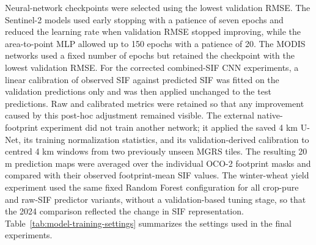 Neural-network checkpoints were selected using the lowest validation RMSE. The Sentinel-2 models used early stopping with a patience of seven epochs and reduced the learning rate when validation RMSE stopped improving, while the area-to-point MLP allowed up to 150 epochs with a patience of 20. The MODIS networks used a fixed number of epochs but retained the checkpoint with the lowest validation RMSE. For the corrected combined-SIF CNN experiments, a linear calibration of observed SIF against predicted SIF was fitted on the validation predictions only and was then applied unchanged to the test predictions. Raw and calibrated metrics were retained so that any improvement caused by this post-hoc adjustment remained visible. The external native-footprint experiment did not train another network; it applied the saved 4 km U-Net, its training normalization statistics, and its validation-derived calibration to centred 4 km windows from two previously unseen MGRS tiles. The resulting 20 m prediction maps were averaged over the individual OCO-2 footprint masks and compared with their observed footprint-mean SIF values. The winter-wheat yield experiment used the same fixed Random Forest configuration for all crop-pure and raw-SIF predictor variants, without a validation-based tuning stage, so that the 2024 comparison reflected the change in SIF representation. Table~\ref{tab:model-training-settings} summarizes the settings used in the final experiments.

